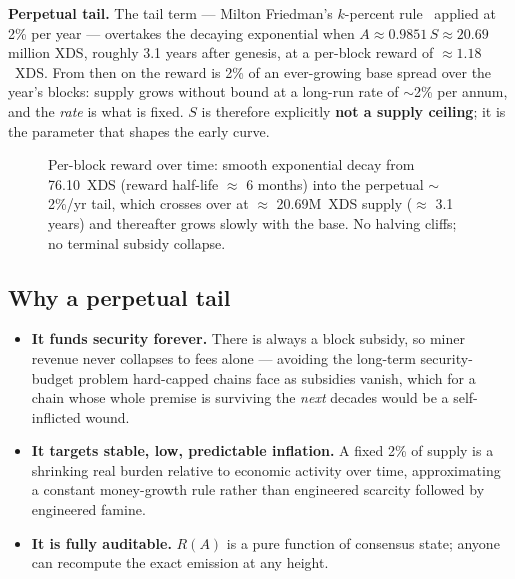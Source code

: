 \documentclass[11pt,a4paper]{article}
\begin{document}
\textbf{Perpetual tail.} The tail term --- Milton Friedman's $k$-percent
rule~\cite{friedman} applied at 2\% per year --- overtakes the decaying
exponential when $A \approx 0.9851\,S \approx 20.69$ million XDS, roughly
3.1 years after genesis, at a per-block reward of $\approx 1.18$~XDS. From
then on the reward is 2\% of an ever-growing base spread over the year's
blocks: supply grows without bound at a long-run rate of $\sim$2\% per annum,
and the \emph{rate} is what is fixed. $S$ is therefore explicitly \textbf{not
a supply ceiling}; it is the parameter that shapes the early curve.

\begin{figure}[tbp]
\centering
{}
\caption{Per-block reward over time: smooth exponential decay from 76.10~XDS
(reward half-life $\approx$ 6 months) into the perpetual $\sim$2\%/yr tail,
which crosses over at $\approx$ 20.69M~XDS supply ($\approx$ 3.1 years) and
thereafter grows slowly with the base. No halving cliffs; no terminal
subsidy collapse.}
\label{fig:emission}
\end{figure}

\subsection{Why a perpetual tail}

\begin{itemize}
\item \textbf{It funds security forever.} There is always a block subsidy,
  so miner revenue never collapses to fees alone --- avoiding the
  long-term security-budget problem hard-capped chains face as subsidies
  vanish, which for a chain whose whole premise is surviving the
  \emph{next} decades would be a self-inflicted wound.
\item \textbf{It targets stable, low, predictable inflation.} A fixed 2\% of
  supply is a shrinking real burden relative to economic activity over time,
  approximating a constant money-growth rule rather than engineered scarcity
  followed by engineered famine.
\item \textbf{It is fully auditable.} $R(A)$ is a pure function of consensus
  state; anyone can recompute the exact emission at any height.
\end{itemize}
\end{document}
